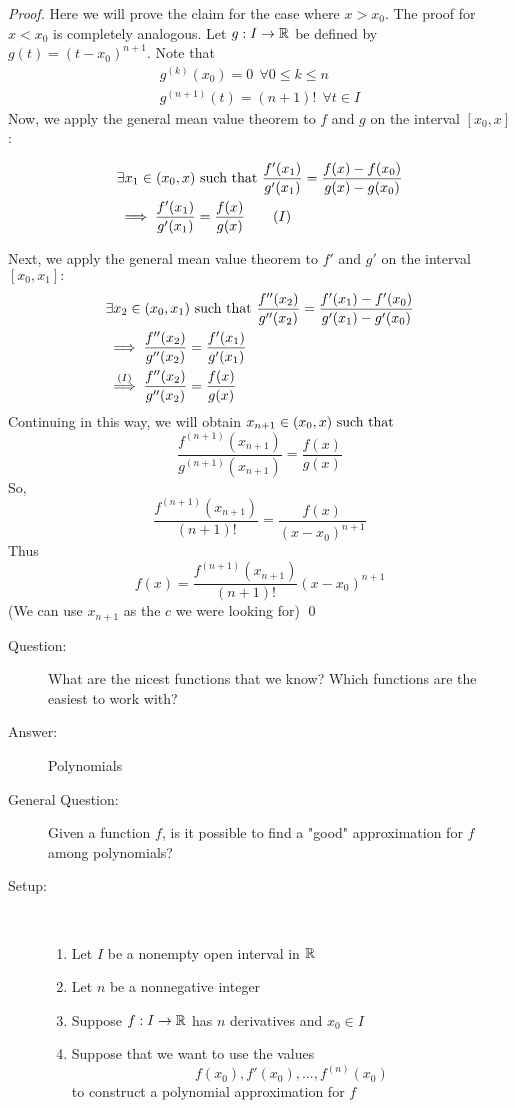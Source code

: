 \begin{proof}
    Here we will prove the claim for the case where $x > x_0$. The proof for $x < x_0$ is completely analogous. Let $g: I \to \mathbb{R}$ be defined by $g(t) = (t-x_0)^{n+1}$. Note that
    \begin{align*}
        g^{(k)}(x_0) = 0 ~~\forall 0 \leq k \leq n \\
        g^{(n+1)}(t)=(n+1)! ~~\forall t \in I
    \end{align*}
    Now, we apply the general mean value theorem to $f$ and $g$ on the interval $[x_0, x]$:

    \begin{align*}
        &\exists x_1 \in (x_0, x) \text{ such that } \frac{f'(x_1)}{g'(x_1)} = \frac{f(x) - f(x_0)}{g(x) - g(x_0)} \\ &\implies
        \frac{f'(x_1)}{g'(x_1)} = \frac{f(x)}{g(x)}
        \tag{$I$}
    \end{align*}

    Next, we apply the general mean value theorem to $f'$ and $g'$ on the interval $[x_0, x_1]:$
    \begin{align*}
        &\exists x_2 \in (x_0, x_1) \text{ such that } \frac{f''(x_2)}{g''(x_2)} = \frac{f'(x_1) - f'(x_0)}{g'(x_1) - g'(x_0)} \\ &\implies
        \frac{f''(x_2)}{g''(x_2)} = \frac{f'(x_1)}{g'(x_1)} \\
        &\overset{(I)}{\implies} \frac{f''(x_2)}{g''(x_2)} = \frac{f(x)}{g(x)}
    \end{align*}
    Continuing in this way, we will obtain $x_{n+1} \in (x_0, x) \text{ such that }$
    $$
    \frac{f^{(n+1)}(x_{n+1})}{g^{(n+1)}(x_{n+1})} = \frac{f(x)}{g(x)}
    $$
    So,
    $$
    \frac{f^{(n+1)}(x_{n+1})}{(n+1)!} = \frac{f(x)}{(x-x_0)^{n+1}}
    $$
    Thus
    $$
    f(x) = \frac{f^{(n+1)}(x_{n+1})}{(n+1)!}(x-x_0)^{n+1}
    $$
    (We can use $x_{n+1}$ as the $c$ we were looking for)
    \qed
\end{proof}

\begin{description}
    \item[Question: ] What are the nicest functions that we know? Which functions are the easiest to work with?
    \item[Answer: ] Polynomials
    \item[General Question: ] Given a function $f$, is it possible to find a "good" approximation for $f$ among polynomials?   
    \item[Setup: ] \leavevmode\\
    \begin{enumerate}[$*)$]
        \item Let $I$ be a nonempty open interval in $\mathbb{R}$
        \item Let $n$ be a nonnegative integer
        \item Suppose $f:I \to \mathbb{R}$ has $n$ derivatives and $x_0 \in I$
        \item Suppose that we want to use the values
        $$
        f(x_0), f'(x_0), ..., f^{(n)}(x_0)
        $$
        to construct a polynomial approximation for $f$
    \end{enumerate}
\end{description}


